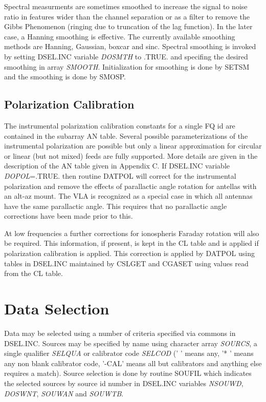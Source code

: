    Spectral measurments are sometimes smoothed to increase the signal
to noise ratio in features wider than the channel separation or as a
filter to remove the Gibbs Phenomenon (ringing due to truncation of
the lag function).  In the later case, a Hanning smoothing is
effective.  The currently available smoothing methods are Hanning,
Gaussian, boxcar and sinc.  Spectral smoothing is invoked by setting
DSEL.INC variable {\it DOSMTH} to .TRUE. and specifing
the desired smoothing in array {\it SMOOTH}.  Initialization for
smoothing is done by SETSM and the smoothing is done by
SMOSP.

\subsection{Polarization Calibration}

   The instrumental polarization calibration constants for a single FQ
id are contained in the subarray AN table.  Several possible
parameterizations of the instrumental polarization are possible but
only a linear approximation for circular or linear (but not mixed)
feeds are fully supported.  More details are given in the description
of the AN table given in Appendix C.  If DSEL.INC
variable {\it DOPOL}=.TRUE. then routine DATPOL will correct
for the instrumental polarization and remove the effects of
parallactic angle rotation for antellas with an alt-az mount.  The VLA
is recognized as a special case in which all antennas have the same
parallactic angle.  This requires that no parallactic angle
corrections have been made prior to this.

   At low frequencies a further corrections for ionospheris Faraday
rotation will also be required.  This information, if present, is kept
in the CL table and is applied if polarization
calibration is applied. This correction is applied by
DATPOL using tables in DSEL.INC
maintained by CSLGET and CGASET using
values read from the CL table.

\section{Data Selection}

   Data may be selected using a number of criteria specified via
commons in DSEL.INC.  Sources may be specified by name using character
array {\it SOURCS}, a single qualifier {\it SELQUA} or calibrator code
{\it SELCOD} (' ' means any, '* ' means any non blank calibrator code,
'-CAL' means all but calibrators and anything else requires a match).
Source selection is done by routine SOUFIL which
indicates the selected sources by source id number in
DSEL.INC variables {\it NSOUWD}, {\it DOSWNT},
{\it SOUWAN} and {\it SOUWTB}.

